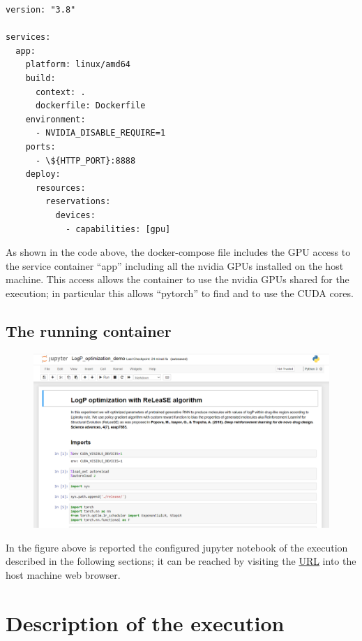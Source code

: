 \documentclass[a4paper]{article}
\begin{document}
\begin{lstlisting}
version: "3.8"

services:
  app:
    platform: linux/amd64
    build:
      context: .
      dockerfile: Dockerfile
    environment:
      - NVIDIA_DISABLE_REQUIRE=1
    ports:
      - \${HTTP_PORT}:8888
    deploy:
      resources:
        reservations:
          devices:
            - capabilities: [gpu]
\end{lstlisting}

As shown in the code above, the docker-compose file includes the GPU access \cite{gpu-support} to the service container “app” including all the nvidia GPUs installed on the host machine. This access allows the container to use the nvidia GPUs shared for the execution; in particular this allows “pytorch” to find and to use the CUDA cores.

\subsection{The running container}\label{sec:The running container}

\begin{figure}[htbp]
		\centering
			\includegraphics[width=\textwidth]{logp-optimization.png}
		\label{fig:logp-optimization}
	\end{figure}

In the figure above is reported the configured jupyter notebook of the execution described in the following sections; it can be reached by visiting the \href{http://localhost:{HTTP_PORT}/LogP_optimization_demo.ipynb}{URL} into the host machine web browser.

\section{Description of the execution}\label{sec:Description of the execution}
\end{document}
